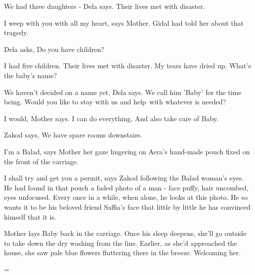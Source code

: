 \documentclass[letterpaper]{article}
\begin{document}
{\textquotedbl}We had three daughters -{\textquotedbl} Dela says. {\textquotedbl}Their lives met with
disaster.{\textquotedbl} 

{\textquotedbl}I weep with you with all my heart,{\textquotedbl} says Mother. Gidal had told her about that tragedy. 

Dela asks, {\textquotedbl}Do you have children?{\textquotedbl} 

{\textquotedbl}I had five children. Their lives met with disaster. My tears have dried up. What's the baby's
name?{\textquotedbl} 

{\textquotedbl}We haven't decided on a name yet,{\textquotedbl} Dela says. {\textquotedbl}We call him 'Baby' for the
time being. Would you like to stay with us and help~with whatever is needed?{\textquotedbl} 

{\textquotedbl}I would,{\textquotedbl} Mother says. {\textquotedbl}I can do everything. And also take care of
Baby.{\textquotedbl} 

Zakod says, {\textquotedbl}We have spare rooms downstairs.{\textquotedbl} 

{\textquotedbl}I'm a Balad,{\textquotedbl} says Mother her gaze lingering on Aera's hand-made pouch fixed on the front
of the carriage. 

{\textquotedbl}I shall try and get you a permit,{\textquotedbl} says Zakod following the Balad woman's eyes. He had
found in that pouch a faded photo of a man - face puffy, hair uncombed, eyes unfocused. Every once in a while, when
alone, he looks at this photo. He so wants it to be his beloved friend Saffia's face that little by little he has
convinced himself that it is. 

Mother lays Baby back in the carriage. Once his sleep deepens, she'll go outside to take down the dry washing from the
line. Earlier, as she'd approached the house, she saw pale blue flowers fluttering there in the breeze. Welcoming her.


\bigskip


\bigskip


\bigskip

{=}


\bigskip
\end{document}
